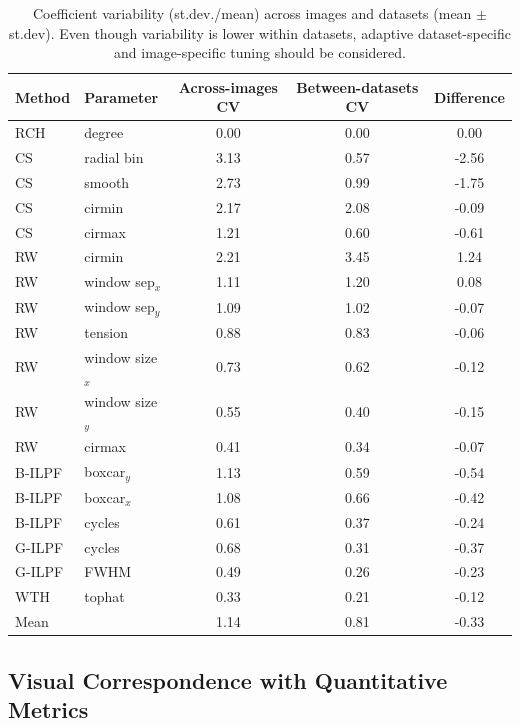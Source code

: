 \documentclass[iucr]{iucrjournals}
\begin{document}
\begin{table}[t]
\centering
\small
\caption{Coefficient variability (st.dev./mean) across images and datasets (mean $\pm$ st.dev). Even though variability is lower within datasets, adaptive dataset-specific and image-specific tuning should be considered.}
\label{tab:summary_total_variability}
\begin{tabular}{llccc}
\toprule
Method & Parameter & Across-images CV & Between-datasets CV & Difference \\
\midrule

RCH & degree & 0.00 & 0.00 & 0.00 \\
CS & radial bin & 3.13 & 0.57 & -2.56 \\
CS & smooth & 2.73 & 0.99 & -1.75 \\
CS & cirmin & 2.17 & 2.08 & -0.09 \\
CS & cirmax & 1.21 & 0.60 & -0.61 \\
RW & cirmin & 2.21 & 3.45 & 1.24 \\
RW & window sep$_x$ & 1.11 & 1.20 & 0.08 \\
RW & window sep$_y$ & 1.09 & 1.02 & -0.07 \\
RW & tension & 0.88 & 0.83 & -0.06 \\
RW & window size$_x$ & 0.73 & 0.62 & -0.12 \\
RW & window size$_y$ & 0.55 & 0.40 & -0.15 \\
RW & cirmax & 0.41 & 0.34 & -0.07 \\
B-ILPF & boxcar$_y$ & 1.13 & 0.59 & -0.54 \\
B-ILPF & boxcar$_x$ & 1.08 & 0.66 & -0.42 \\
B-ILPF & cycles & 0.61 & 0.37 & -0.24 \\
G-ILPF & cycles & 0.68 & 0.31 & -0.37 \\
G-ILPF & FWHM & 0.49 & 0.26 & -0.23 \\
WTH & tophat & 0.33 & 0.21 & -0.12 \\
\midrule
Mean &  & 1.14 & 0.81 & -0.33 \\

\bottomrule
\end{tabular}
\end{table}


\subsection{Visual Correspondence with Quantitative Metrics}
\end{document}
